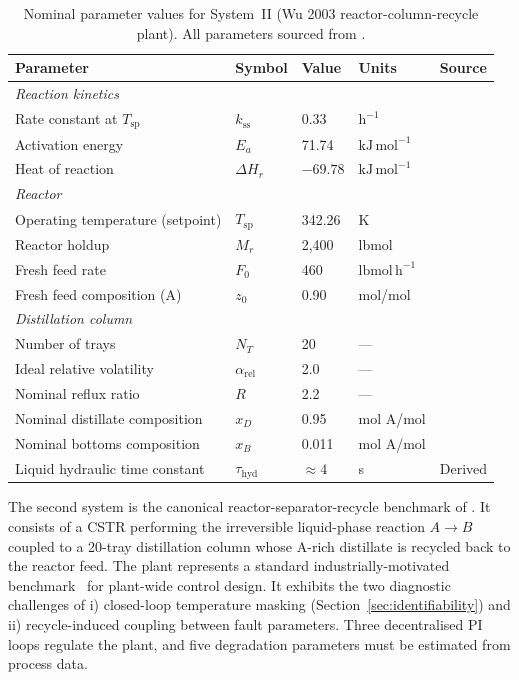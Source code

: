 \documentclass[aps,pre,twocolumn,superscriptaddress]{revtex4-2}
\begin{document}
\begin{table}[thbp]
\centering
\caption{Nominal parameter values for System~II (Wu 2003 reactor-column-recycle plant). All parameters sourced from \citet[Table~1]{Wu2003}.}
\label{tab:si_wu_params}
\small
\begin{tabular}{lllll}
\toprule
Parameter & Symbol & Value & Units & Source \\
\midrule
\multicolumn{5}{l}{\textit{Reaction kinetics}} \\
Rate constant at $T_\mathrm{sp}$ & $k_\mathrm{ss}$ & 0.33 & $\mathrm{h}^{-1}$ & \citealt{Wu2003} \\
Activation energy & $E_a$ & 71.74 & $\mathrm{kJ\,mol}^{-1}$ & \citealt{Wu2003} \\
Heat of reaction & $\Delta H_r$ & $-69.78$ & $\mathrm{kJ\,mol}^{-1}$ & \citealt{Wu2003} \\
\midrule
\multicolumn{5}{l}{\textit{Reactor}} \\
Operating temperature (setpoint) & $T_\mathrm{sp}$ & 342.26 & K & \citealt{Wu2003} \\
Reactor holdup & $M_r$ & 2{,}400 & lbmol & \citealt{Wu2003} \\
Fresh feed rate & $F_0$ & 460 & $\mathrm{lbmol\,h}^{-1}$ & \citealt{Wu2003} \\
Fresh feed composition (A) & $z_0$ & 0.90 & mol/mol & \citealt{Wu2003} \\
\midrule
\multicolumn{5}{l}{\textit{Distillation column}} \\
Number of trays & $N_T$ & 20 & — & \citealt{Wu2003} \\
Ideal relative volatility & $\alpha_\mathrm{rel}$ & 2.0 & — & \citealt{Wu2003} \\
Nominal reflux ratio & $R$ & 2.2 & — & \citealt{Wu2003} \\
Nominal distillate composition & $x_D$ & 0.95 & mol A/mol & \citealt{Wu2003} \\
Nominal bottoms composition & $x_B$ & 0.011 & mol A/mol & \citealt{Wu2003} \\
Liquid hydraulic time constant & $\tau_\mathrm{hyd}$ & $\approx 4$ & s & Derived \\
\bottomrule
\end{tabular}
\end{table}


The second system is the canonical reactor-separator-recycle benchmark of \citet{Wu2003}. It consists of a CSTR performing the irreversible liquid-phase reaction
$A \to B$ coupled to a 20-tray distillation column whose A-rich distillate is recycled back to the reactor feed. The plant represents a standard industrially-motivated benchmark~\citep{Luyben1993,Luyben1994,LuybenTyreus1997} for plant-wide control design. It exhibits the two diagnostic challenges of i) closed-loop temperature masking (Section~\ref{sec:identifiability}) and ii) recycle-induced coupling between fault parameters. Three decentralised PI loops regulate the plant, and five degradation parameters must be estimated from process data.
\end{document}
